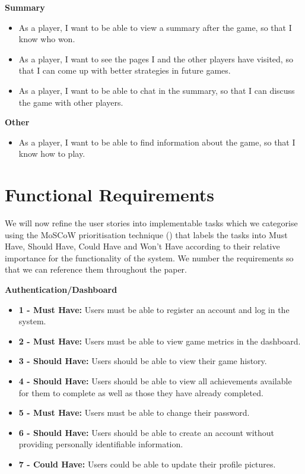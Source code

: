 \documentclass{l4proj}
\begin{document}
\textbf{Summary}
\begin{itemize}
    \item As a player, I want to be able to view a summary after the game, so that I know who won.
    \item As a player, I want to see the pages I and the other players have visited, so that I can come up with better strategies in future games.
    \item As a player, I want to be able to chat in the summary, so that I can discuss the game with other players.
\end{itemize}

\textbf{Other}
\begin{itemize}
    \item As a player, I want to be able to find information about the game, so that I know how to play.
\end{itemize}

\section{Functional Requirements}
We will now refine the user stories into implementable tasks which we categorise using the MoSCoW prioritisation technique (\cite{moscow}) that labels the tasks into Must Have, Should Have, Could Have and Won't Have according to their relative importance for the functionality of the system. We number the requirements so that we can reference them throughout the paper.

\textbf{Authentication/Dashboard}
\begin{itemize}
    \item[] \textbf{1 - Must Have:} Users must be able to register an account and log in the system.
    \item[] \textbf{2 - Must Have:} Users must be able to view game metrics in the dashboard.
    \item[] \textbf{3 - Should Have:} Users should be able to view their game history.
    \item[] \textbf{4 - Should Have:} Users should be able to view all achievements available for them to complete as well as those they have already completed.
    \item[] \textbf{5 - Must Have:} Users must be able to change their password.
    \item[] \textbf{6 - Should Have:} Users should be able to create an account without providing personally identifiable information.
    \item[] \textbf{7 - Could Have:} Users could be able to update their profile pictures.
\end{itemize}
\end{document}

